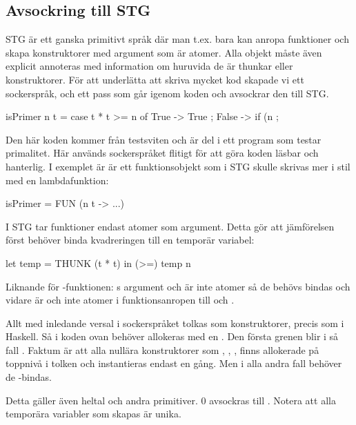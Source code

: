 \documentclass[../Core]{subfiles}
\begin{document}
\subsection{Avsockring till STG}
STG är ett ganska primitivt språk där man t.ex. bara kan anropa funktioner
och skapa konstruktorer med argument som är atomer. Alla objekt måste även
explicit annoteras med information om huruvida de är thunkar eller konstruktorer. För att underlätta
att skriva mycket kod skapade vi ett sockerspråk, och ett
pass som går igenom koden och avsockrar den till STG.

\begin{codeEx}
isPrimer n t = case t * t >= n of
    { True -> True
    ; False -> if (n %
    };
\end{codeEx}

Den här koden kommer från testsviten och är del i ett program som testar
primalitet. Här används sockerspråket flitigt för att göra koden läsbar
och hanterlig. I exemplet är  är ett funktionsobjekt som i 
STG skulle skrivas mer i stil med en lambdafunktion:

\begin{codeEx}          
isPrimer = FUN (n t -> ...)
\end{codeEx}


I STG tar funktioner endast atomer som argument. Detta gör att 
jämförelsen  först behöver binda kvadreringen
till en temporär variabel:

\begin{codeEx}
let temp = THUNK (t * t)
in  (>=) temp n
\end{codeEx}

Liknande för -funktionen: s argument  och 
 är inte atomer så de behövs bindas och vidare
är  och  inte atomer i  
funktionsanropen till \miniCode{==} och .


Allt med inledande versal i sockerspråket tolkas som konstruktorer,
precis som i Haskell. Så  i koden ovan behöver allokeras med
en . Den första grenen blir i så fall
  .
Faktum är att alla nullära konstruktorer som , , , finns 
allokerade på toppnivå i tolken och instantieras endast en gång. 
Men i alla andra fall behöver de -bindas.

Detta gäller även heltal och andra primitiver. $0$ avsockras till
. Notera att alla temporära variabler som skapas är unika.
            
\end{document}
